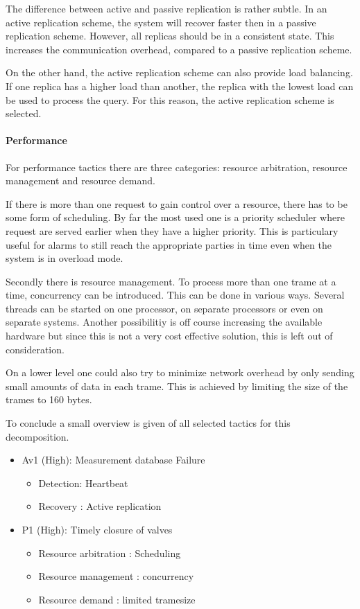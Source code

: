 \npar The difference between active and passive replication is rather subtle.
In an active replication scheme, the system will recover faster then in a
passive replication scheme. However, all replicas should be in a consistent
state. This increases the communication overhead, compared to a passive
replication scheme. 

\npar On the other hand, the active replication scheme can also provide load
balancing. If one replica has a higher load than another, the replica with the
lowest load can be used to process the query. For this reason, the active
replication scheme is selected. 

\paragraph{Performance} 

\npar For performance tactics there are three categories: resource
arbitration, resource management and resource demand.

\npar If there is more than one request to gain control over a resource, there
has to be some form of scheduling. By far the most used one is a priority
scheduler where request are served earlier when they have a higher priority.
This is particulary useful for alarms to still reach the appropriate parties in
time even when the system is in overload mode. 

\npar Secondly there is resource management. To process more than one trame at a
time, concurrency can be introduced. This can be done in various ways. Several
threads can be started on one processor, on separate processors or even on
separate systems. Another possibilitiy is off course increasing the available
hardware but since this is not a very cost effective solution, this is left out
of consideration.

\npar On a lower level one could also try to minimize network overhead by
only sending small amounts of data in each trame. This is achieved by
limiting the size of the trames to 160 bytes.

\npar To conclude a small overview is given of all selected tactics for this
decomposition.

\begin{itemize}
 	\item Av1 (High): Measurement database Failure
 	\begin{itemize}
 		\item Detection: Heartbeat 
 		\item Recovery : Active replication
 	\end{itemize}
  	\item P1 (High): Timely closure of valves
  	\begin{itemize}
  		\item Resource arbitration : Scheduling
		\item Resource management  : concurrency
		\item Resource demand      : limited tramesize
  	\end{itemize}
\end{itemize}

